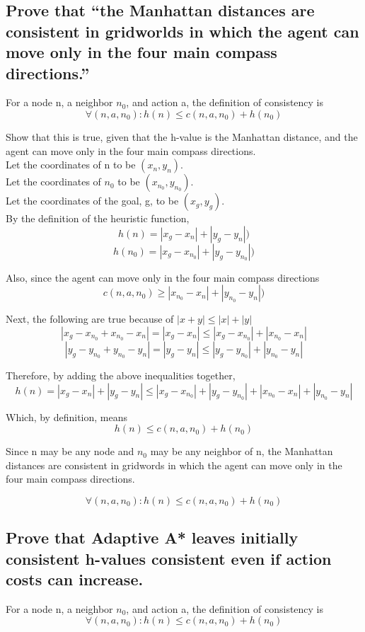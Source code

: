 \documentclass{article}
\begin{document}
\subsection{Prove that “the Manhattan distances are consistent in gridworlds in which the agent can move only in the four main compass directions.”}
For a node n, a neighbor $n_0$, and action a, the definition of consistency is \[ \forall (n,a,n_0): h(n) \leq  c(n,a,n_0)+h(n_0)\]

Show that this is true, given that the h-value is the Manhattan distance, and the agent can move only in the four main compass directions.\\

Let the coordinates of n to be $(x_n,y_n)$.\\
Let the coordinates of $n_0$ to be $(x_{n_0},y_{n_0})$.\\
Let the coordinates of the goal, g, to be $(x_g,y_g)$.\\

By the definition of the heuristic function,
\[ h(n)=|x_g-x_n|+|y_g-y_n|)\]
\[ h(n_0)=|x_g-x_{n_0}|+|y_g-y_{n_0}|)\]

Also, since the agent can move only in the four main compass directions
\[ c(n,a,n_0)\geq|x_{n_0}-x_n|+|y_{n_0}-y_n|)\]

Next, the following are true because of $|x+y|\leq|x|+|y|$
\[ |x_g-x_{n_0}+x_{n_0}-x_n|=|x_g-x_n|\leq|x_g-x_{n_0}|+|x_{n_0}-x_n| \]
\[ |y_g-y_{n_0}+y_{n_0}-y_n|=|y_g-y_n|\leq|y_g-y_{n_0}|+|y_{n_0}-y_n| \]

Therefore, by adding the above inequalities together,
\[ h(n)=|x_g-x_n|+|y_g-y_n|\leq|x_g-x_{n_0}|+|y_g-y_{n_0}|+|x_{n_0}-x_n|+|y_{n_0}-y_n| \]

Which, by definition, means
\[h(n)\leq c(n,a,n_0)+h(n_0) \] 

Since n may be any node and $n_0$ may be any neighbor of n, the Manhattan distances are consistent in gridwords in which the agent can move only in the four main compass directions.

\[ \forall (n,a,n_0): h(n) \leq  c(n,a,n_0)+h(n_0)\]

\subsection{Prove that Adaptive A* leaves initially consistent h-values consistent even if action costs can increase.}

For a node n, a neighbor $n_0$, and action a, the definition of consistency is \[ \forall (n,a,n_0): h(n) \leq  c(n,a,n_0)+h(n_0)\]
\end{document}
